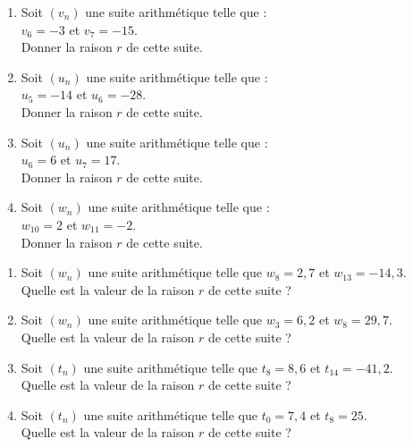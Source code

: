 \documentclass[11pt]{article}
\begin{document}
\begin{multicols}{2}
\begin{exercice}[1]
\begin{enumerate}
\item Soit $(v_n)$ une suite arithmétique telle que :\\
$v_{6}=-3$ et $v_{7}=-15$.\\Donner la raison $r$ de cette suite.
\item Soit $(u_n)$ une suite arithmétique telle que :\\
$u_{5}=-14$ et $u_{6}=-28$.\\Donner la raison $r$ de cette suite.
\item Soit $(u_n)$ une suite arithmétique telle que :\\
$u_{6}=6$ et $u_{7}=17$.\\Donner la raison $r$ de cette suite.
\item Soit $(w_n)$ une suite arithmétique telle que :\\
$w_{10}=2$ et $w_{11}=-2$.\\Donner la raison $r$ de cette suite.
\end{enumerate}
\end{exercice}

\begin{exercice}[2]
\begin{enumerate}
\item Soit $(w_n)$ une suite arithmétique telle que $w_{8}=2{,}7$ et $w_{13}=-14{,}3$.\\
Quelle est la valeur de la raison $r$ de cette suite ?
\item Soit $(w_n)$ une suite arithmétique telle que $w_{3}=6{,}2$ et $w_{8}=29{,}7$.\\
Quelle est la valeur de la raison $r$ de cette suite ?
\item Soit $(t_n)$ une suite arithmétique telle que $t_{8}=8{,}6$ et $t_{14}=-41{,}2$.\\
Quelle est la valeur de la raison $r$ de cette suite ?
\item Soit $(t_n)$ une suite arithmétique telle que $t_{0}=7{,}4$ et $t_{8}=25$.\\
Quelle est la valeur de la raison $r$ de cette suite ?
\end{enumerate}
\end{exercice}
\end{multicols}
\end{document}
